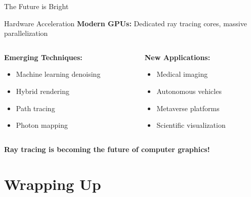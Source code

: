 \begin{frame}{The Future is Bright}
    \begin{conceptbox}{Hardware Acceleration}
        \textbf{Modern GPUs:} Dedicated ray tracing cores, massive parallelization
    \end{conceptbox}
    
    \vspace{0.3cm}
    
    \begin{columns}
        \begin{column}{0.5\textwidth}
            \textbf{Emerging Techniques:}
            \begin{itemize}
                \item Machine learning denoising
                \item Hybrid rendering
                \item Path tracing
                \item Photon mapping
            \end{itemize}
        \end{column}
        \begin{column}{0.5\textwidth}
            \textbf{New Applications:}
            \begin{itemize}
                \item Medical imaging
                \item Autonomous vehicles
                \item Metaverse platforms
                \item Scientific visualization
            \end{itemize}
        \end{column}
    \end{columns}
    
    \vspace{0.5cm}
    
    \begin{center}
        \large \textcolor{PrimaryColor}{\textbf{Ray tracing is becoming the future of computer graphics!}}
    \end{center}
\end{frame}

\section{Wrapping Up}


